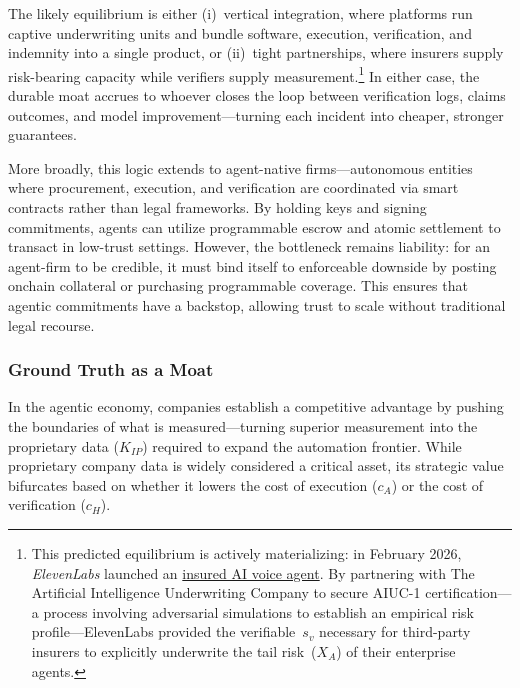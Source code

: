 \documentclass[12pt, letter]{article}
\begin{document}
\begin{enumerate}
The likely equilibrium is either (i)~vertical integration, where platforms run captive underwriting units and bundle software, execution, verification, and indemnity into a single product, or (ii)~tight partnerships, where insurers supply risk-bearing capacity while verifiers supply measurement.\footnote{This predicted equilibrium is actively materializing: in February 2026, \emph{ElevenLabs} launched an \href{https://elevenlabs.io/blog/aiuc-announcement}{insured AI voice agent}. By partnering with The Artificial Intelligence Underwriting Company to secure AIUC-1 certification---a process involving adversarial simulations to establish an empirical risk profile---ElevenLabs provided the verifiable~$s_v$ necessary for third-party insurers to explicitly underwrite the tail risk~($X_A$) of their enterprise agents.} In either case, the durable moat accrues to whoever closes the loop between verification logs, claims outcomes, and model improvement---turning each incident into cheaper, stronger guarantees.

More broadly, this logic extends to agent-native firms—autonomous entities where procurement, execution, and verification are coordinated via smart contracts rather than legal frameworks. By holding keys and signing commitments, agents can utilize programmable escrow and atomic settlement to transact in low-trust settings. However, the bottleneck remains liability: for an agent-firm to be credible, it must bind itself to enforceable downside by posting onchain collateral or purchasing programmable coverage. This ensures that agentic commitments have a backstop, allowing trust to scale without traditional legal recourse.


\end{enumerate}

\subsubsection{Ground Truth as a Moat}

In the agentic economy, companies establish a competitive advantage by pushing the boundaries of what is measured—turning superior measurement into the proprietary data ($K_{IP}$) required to expand the automation frontier. While proprietary company data is widely considered a critical asset, its strategic value bifurcates based on whether it lowers the cost of execution ($c_A$) or the cost of verification ($c_H$).
\end{document}

